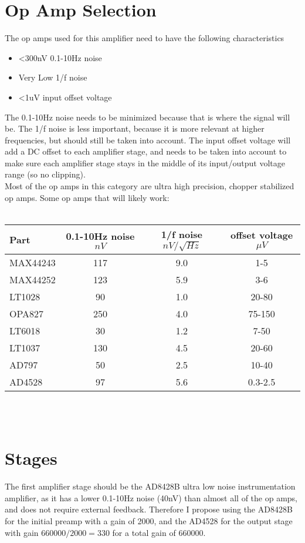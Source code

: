 \documentclass{article}
\begin{document}
\section{Op Amp Selection}
The op amps used for this amplifier need to have the following characteristics
\begin{itemize}
    \item \textless300nV 0.1-10Hz noise
    \item Very Low 1/f noise
    \item \textless1uV input offset voltage
\end{itemize}
The 0.1-10Hz noise needs to be minimized because that is where the signal will
be. The 1/f noise is less important, because it is more relevant at higher
frequencies, but should still be taken into account. The input offset voltage
will add a DC offset to each amplifier stage, and needs to be taken into
account to make sure each amplifier stage stays in the middle of its
input/output voltage range (so no clipping). \\ 
Most of the op amps in this category are ultra high precision, chopper
stabilized op amps. Some op amps that will likely work:\\ \\
\begin{tabular}{|l|c|c|c|}
    \hline
    Part & 0.1-10Hz noise $nV$ & 1/f noise $nV/\sqrt{Hz}$ & offset voltage $\mu V$ \\\hline
    MAX44243 & 117 & 9.0 & 1-5 \\\hline
    MAX44252 & 123 & 5.9 & 3-6 \\ \hline
    LT1028   & 90  & 1.0 & 20-80 \\ \hline
    OPA827   & 250 & 4.0 & 75-150 \\ \hline
    LT6018   & 30  & 1.2 & 7-50 \\ \hline
    LT1037   & 130 & 4.5 & 20-60 \\ \hline
    AD797    & 50  & 2.5 & 10-40 \\ \hline
    AD4528   & 97  & 5.6 & 0.3-2.5 \\ \hline
\end{tabular}\\ \\

\section{Stages}
The first amplifier stage should be the AD8428B ultra low noise instrumentation amplifier, as it has a lower 0.1-10Hz noise (40nV) than almost all of the op amps, and does not require external feedback. Therefore I propose using the AD8428B for the initial preamp with a gain of 2000, and the AD4528 for the output stage with gain $660000/2000 = 330$ for a total gain of $660000$.
\end{document}
